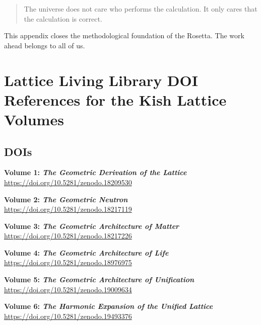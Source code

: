 \documentclass[12pt,oneside]{book}
\begin{document}
\begin{quote}
The universe does not care who performs the calculation.  
It only cares that the calculation is correct.
\end{quote}

This appendix closes the methodological foundation of the Rosetta.  
The work ahead belongs to all of us.

\chapter{Lattice Living Library DOI References for the Kish Lattice Volumes}
\section{DOIs}

\noindent\textbf{Volume 1: \emph{The Geometric Derivation of the Lattice}}\\
\href{https://doi.org/10.5281/zenodo.18209530}{https://doi.org/10.5281/zenodo.18209530}

\vspace{1em}
\noindent\textbf{Volume 2: \emph{The Geometric Neutron}}\\
\href{https://doi.org/10.5281/zenodo.18217119}{https://doi.org/10.5281/zenodo.18217119}

\vspace{1em}
\noindent\textbf{Volume 3: \emph{The Geometric Architecture of Matter}}\\
\href{https://doi.org/10.5281/zenodo.18217226}{https://doi.org/10.5281/zenodo.18217226}

\vspace{1em}
\noindent\textbf{Volume 4: \emph{The Geometric Architecture of Life}}\\
\href{https://doi.org/10.5281/zenodo.18976975}{https://doi.org/10.5281/zenodo.18976975}

\vspace{1em}
\noindent\textbf{Volume 5: \emph{The Geometric Architecture of Unification}}\\
\href{https://doi.org/10.5281/zenodo.19009634}{https://doi.org/10.5281/zenodo.19009634}

\vspace{1em}
\noindent\textbf{Volume 6: \emph{The Harmonic Expansion of the Unified Lattice}}\\
\href{https://doi.org/10.5281/zenodo.19493376}{https://doi.org/10.5281/zenodo.19493376}
\end{document}

